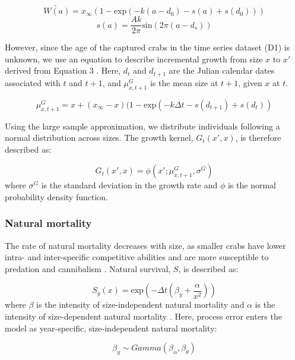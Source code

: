 \documentclass{article}
\begin{document}
\begin{equation}
\widetilde{W(a)} = x_{\infty}(1-\text{exp}(-k(a-d_0) - s(a) + s(d_0)))
\end{equation}
\begin{equation}
s(a) = \frac{Ak}{2\pi} \text{sin}(2\pi(a-d_s)) 
\end{equation}

However, since the age of the captured crabs in the time series dataset (D1) is unknown, we use an equation to describe incremental growth from size $x$ to $x'$ derived from Equation 3 \parencite{white2016fitting}. Here, $d_t$ and $d_{t+1}$ are the Julian calendar dates associated with $t$ and $t+1$, and $\mu^G_{x,t+1}$ is the mean size at $t+1$, given $x$ at $t$.

\begin{equation}
\mu^G_{x,t+1} = x + (x_{\infty}-x)(1-\text{exp}(-k\Delta t-s(d_{t+1})+s(d_t))
\end{equation}

Using the large sample approximation, we distribute individuals following a normal distribution across sizes. The growth kernel, $G_t(x',x)$, is therefore described as:

\begin{equation}
G_t(x',x) = \phi(x'; \mu^G_{x, t+1}, \sigma^G)
\end{equation}
where $\sigma^G$ is the standard deviation in the growth rate and $\phi$ is the normal probability density function.

\subsubsection*{Natural mortality}

The rate of natural mortality decreases with size, as smaller crabs have lower intra- and inter-specific competitive abilities and are more susceptible to predation and cannibalism \parencite{maszczyk2018body, grosholz2021stage}. Natural survival, $S$, is described as: 

\begin{equation}
S_y(x) = \text{exp}\left(-\Delta t(\beta_y+\frac{\alpha}{x^2})\right)
\end{equation}
where $\beta$ is the intensity of size-independent natural mortality and $\alpha$ is the intensity of size-dependent natural mortality \parencite{carlson2010bayesian}. Here, process error enters the model as year-specific, size-independent natural mortality:

\begin{equation}
\beta_y \sim Gamma(\beta_{\alpha}, \beta_{\theta})
\end{equation}
\end{document}
